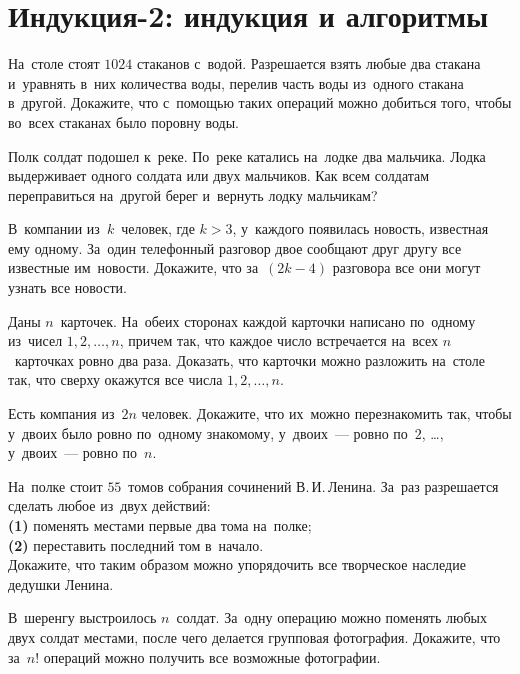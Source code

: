 
\section*{Индукция-2: индукция и алгоритмы}


\begin{problems}

\item
На~столе стоят $1024$ стаканов с~водой.
Разрешается взять любые два стакана и~уравнять в~них количества воды, перелив
часть воды из~одного стакана в~другой.
Докажите, что с~помощью таких операций можно добиться того, чтобы во~всех
стаканах было поровну воды.

\item
Полк солдат подошел к~реке.
По~реке катались на~лодке два мальчика.
Лодка выдерживает одного солдата или двух мальчиков.
Как всем солдатам переправиться на~другой берег и~вернуть лодку мальчикам?

\item
В~компании из~$k$~человек, где $k > 3$, у~каждого появилась новость, известная
ему одному.
За~один телефонный разговор двое сообщают друг другу все известные им~новости.
Докажите, что за~$(2 k - 4)$ разговора все они могут узнать все новости.

\item
Даны $n$~карточек.
На~обеих сторонах каждой карточки написано по~одному из~чисел
$1, 2, \ldots, n$, причем так, что каждое число встречается на~всех
$n$~карточках ровно два раза.
Доказать, что карточки можно разложить на~столе так, что сверху окажутся все
числа $1, 2, \ldots, n$.

\item
Есть компания из~$2 n$ человек.
Докажите, что их~можно перезнакомить так, чтобы у~двоих было ровно по~одному
знакомому, у~двоих~--- ровно по~$2$, \ldots, у~двоих~--- ровно по~$n$.

\item
На~полке стоит $55$~томов собрания сочинений В.\,И.\,Ленина.
За~раз разрешается сделать любое из~двух действий:
\\
\textbf{(1)} поменять местами первые два тома на~полке;
\\
\textbf{(2)} переставить последний том в~начало.
\\
Докажите, что таким образом можно упорядочить все творческое наследие дедушки
Ленина.

\item
В~шеренгу выстроилось $n$~солдат.
За~одну операцию можно поменять любых двух солдат местами, после чего делается
групповая фотография.
Докажите, что за~$n!$ операций можно получить все возможные фотографии.

\end{problems}

